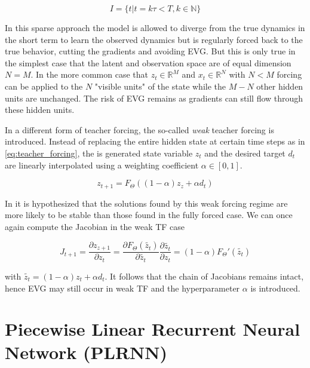 \begin{equation}
    I = \{ t | t = k \tau < T, k \in \mathbb{N} \}
\end{equation}

In this sparse approach the model is allowed to diverge from the true dynamics in the short term to learn the observed dynamics but is regularly forced 
back to the true behavior, cutting the gradients and avoiding EVG. But this is only true in the simplest case that the latent and observation space are
of equal dimension $N=M$. In the more common case that $z_t \in \mathbb{R}^M$ and $x_t \in \mathbb{R}^N$ with $N<M$ forcing can be applied to the $N$ 
"visible units" of the state while the $M-N$ other hidden units are unchanged. The risk of EVG remains as gradients can still flow through these 
hidden units.

In \cite{doya1992bifurcations} a different form of teacher forcing, the so-called \textit{weak} teacher forcing is introduced. Instead of replacing 
the entire hidden state at certain time steps as in \ref{eq:teacher_forcing}, the is generated state variable $z_t$ and the desired target $d_t$ are 
linearly interpolated using a weighting coefficient $\alpha \in [0,1]$.

\begin{equation}
    z_{t+1} = F_{\Theta}((1-\alpha)z_z + \alpha d_t)
    \label{eq:weak_tf}
\end{equation}

In \cite{doya1992bifurcations} it is hypothesized that the solutions found by this weak forcing regime are more likely to be stable than those found 
in the fully forced case. We can once again compute the Jacobian in the weak TF case

\begin{equation}
    J_{t+1} = \frac{\partial z_{z+1}}{\partial z_{t}} = \frac{\partial F_{\Theta} (\tilde{z_t})}{\partial \tilde{z_t}} \frac{\partial \tilde{z_t}}{\partial z_t} = (1-\alpha) F_{\Theta}'(\tilde{z_t})
\end{equation}

with $\tilde{z_t} = (1-\alpha) z_t + \alpha d_t$. It follows that the chain of Jacobians remains intact, hence EVG may still occur in weak TF and the 
hyperparameter $\alpha$ is introduced.

\section{Piecewise Linear Recurrent Neural Network (PLRNN)}

